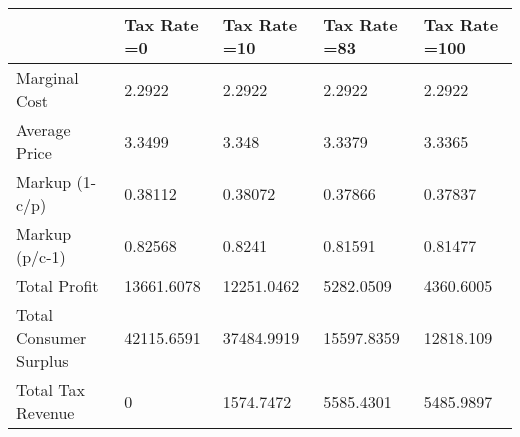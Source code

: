 \begin{tabular}{lllll}
& Tax Rate =0 & Tax Rate =10 & Tax Rate =83 & Tax Rate =100 \\ 
\hline 
Marginal Cost & 2.2922 & 2.2922 & 2.2922 & 2.2922 \\ 
Average Price & 3.3499 & 3.348 & 3.3379 & 3.3365 \\ 
Markup (1-c/p) & 0.38112 & 0.38072 & 0.37866 & 0.37837 \\ 
Markup (p/c-1) & 0.82568 & 0.8241 & 0.81591 & 0.81477 \\ 
Total Profit & 13661.6078 & 12251.0462 & 5282.0509 & 4360.6005 \\ 
Total Consumer Surplus & 42115.6591 & 37484.9919 & 15597.8359 & 12818.109 \\ 
Total Tax Revenue & 0 & 1574.7472 & 5585.4301 & 5485.9897 \\ 
\hline 
\end{tabular}